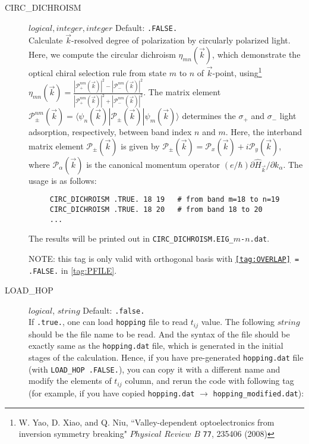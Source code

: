\documentclass[a4paper,12pt]{scrartcl}
\makeatletter
\def\namedlabel#1#2{\begingroup
    #2%
    \def\@currentlabel{#2}%
    \phantomsection\label{#1}\endgroup
}
\makeatother
\begin{document}
\begin{description}
     \item[\namedlabel{tag:CIRC}{CIRC\_DICHROISM}] $logical, integer, integer$ Default: \texttt{.FALSE.} \\  
		Calculate ${\vec k}$-resolved degree of polarization by circularly polarized light. Here, we compute the circular dichroism $\eta_{mn}({\vec k})$, which demonstrate the optical chiral selection rule from state $m$ to $n$ of ${\vec k}$-point, using\footnote{W. Yao, D. Xiao, and Q. Niu, ``Valley-dependent optoelectronics from inversion symmetry breaking" $Physical$ $Review$ $B$  \texttt{77}, 235406 (2008)}
				$\eta_{mn}({\vec k}) = \frac{|\mathcal{P}^{nm}_+({\vec k})|^2 - |\mathcal{P}^{nm}_-({\vec k})|^2}{|\mathcal{P}^{nm}_+({\vec k})|^2 + |\mathcal{P}^{nm}_-({\vec k})|^2}$. 
				The matrix element $\mathcal{P}^{nm}_{\pm}({\vec k}) = \langle \psi_n({\vec k})|  \mathcal{P}_{\pm}({\vec k}) |\psi_m({\vec k}) \rangle$ determines the $\sigma_+$ and $\sigma_-$ light adsorption, respectively, between band index $n$ and $m$. 
				Here, the interband matrix element $\mathcal{P}_{\pm}({\vec k})$ is given by 
				$\mathcal{P}_{\pm}({\vec k}) = \mathcal{P}_x({\vec k}) + i \mathcal{P}_y({\vec k})$, where $\mathcal{P}_\alpha({\vec k})$ is the canonical momentum operator $(e/\hbar) \partial \hat{H}_{\vec k} / \partial k_\alpha$.
				The usage is as follows:
	
    \begin{verbatim}
     CIRC_DICHROISM .TRUE. 18 19   # from band m=18 to n=19
     CIRC_DICHROISM .TRUE. 18 20   # from band 18 to 20
     ...
    \end{verbatim}
						The results will be printed out in \texttt{CIRC\_DICHROISM.EIG\_$m$-$n$.dat}.
		
		NOTE: this tag is only valid with orthogonal basis with \texttt{\ref{tag:OVERLAP} = .FALSE.} in \ref{tag:PFILE}.

    \item[\namedlabel{tag:LOADHOP}{LOAD\_HOP}] $logical$, $string$ Default: \texttt{.false.} \\
		If \texttt{.true.}, one can load \texttt{hopping} file to read $t_{ij}$ value. The following $string$ should be the file name to be read. And the syntax of the file should be exactly same as the \texttt{hopping.dat} file, which is generated in the initial stages of the calculation.
		Hence, if you have pre-generated \texttt{hopping.dat} file (with \texttt{LOAD\_HOP .FALSE.}), you can copy it with a different name and modify the elements of $t_{ij}$ column, and rerun the code with following tag (for example, if you have copied \texttt{hopping.dat} $\rightarrow$ \texttt{hopping\_modified.dat}):
		

\end{description}
\end{document}
